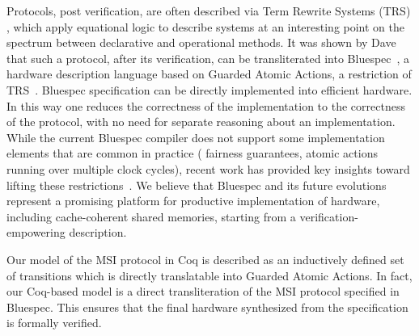 Protocols, post verification, are often described via Term Rewrite Systems (TRS)
, which apply equational logic to describe systems at
an interesting point on the spectrum between declarative and operational
methods.  It was shown by Dave \etal{}~\cite{DNA:CoherenceImplementation} that
such a protocol, after its verification, can be transliterated into
Bluespec~\cite{Bluespec:TFRG}, a hardware description language based on Guarded
Atomic Actions, a restriction of TRS~\cite{Hoe:TCAD}. Bluespec specification can
be directly implemented into efficient hardware. In this way one reduces the
correctness of the implementation to the correctness of the protocol, with no
need for separate reasoning about an implementation. While the current Bluespec
compiler does not support some implementation elements that are common in
practice (\eg{} fairness guarantees, atomic actions running over multiple clock
cycles), recent work has provided key insights toward lifting these
restrictions~\cite{Karczmarek}. We believe that Bluespec and its future
evolutions represent a promising platform for productive implementation of
hardware, including cache-coherent shared memories, starting from a
verification-empowering description. 

Our model of the MSI protocol in Coq is described as an inductively defined set
of transitions which is directly translatable into Guarded Atomic Actions. In
fact, our Coq-based model is a direct transliteration of the MSI protocol
specified in Bluespec.  This ensures that the final hardware synthesized from
the specification is formally verified.

%

